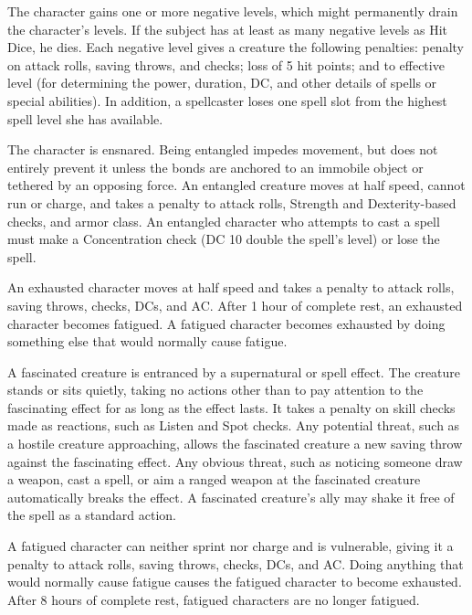  The character gains one or more negative levels, which might permanently drain the character's levels. If the subject has at least as many negative levels as Hit Dice, he dies. Each negative level gives a creature the following penalties:  penalty on attack rolls, saving throws, and checks; loss of 5 hit points; and  to effective level (for determining the power, duration, DC, and other details of spells or special abilities). In addition, a spellcaster loses one spell slot from the highest spell level she has available.

 The character is ensnared. Being entangled impedes movement, but does not entirely prevent it unless the bonds are anchored to an immobile object or tethered by an opposing force. An entangled creature moves at half speed, cannot run or charge, and takes a  penalty to attack rolls, Strength and Dexterity-based checks, and armor class. An entangled character who attempts to cast a spell must make a Concentration check (DC 10 \add double the spell's level) or lose the spell.

 An exhausted character moves at half speed and takes a  penalty to attack rolls, saving throws, checks, DCs, and AC. After 1 hour of complete rest, an exhausted character becomes fatigued. A fatigued character becomes exhausted by doing something else that would normally cause fatigue.

 A fascinated creature is entranced by a supernatural or spell effect. The creature stands or sits quietly, taking no actions other than to pay attention to the fascinating effect for as long as the effect lasts. It takes a  penalty on skill checks made as reactions, such as Listen and Spot checks. Any potential threat, such as a hostile creature approaching, allows the fascinated creature a new saving throw against the fascinating effect. Any obvious threat, such as noticing someone draw a weapon, cast a spell, or aim a ranged weapon at the fascinated creature automatically breaks the effect. A fascinated creature's ally may shake it free of the spell as a standard action.

 A fatigued character can neither sprint nor charge and is vulnerable, giving it a  penalty to attack rolls, saving throws, checks, DCs, and AC. Doing anything that would normally cause fatigue causes the fatigued character to become exhausted. After 8 hours of complete rest, fatigued characters are no longer fatigued.

